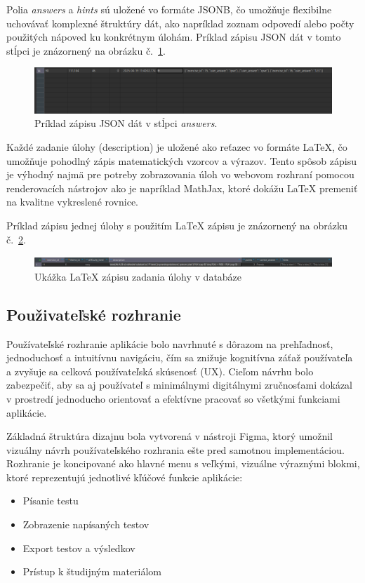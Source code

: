 Polia \textit{answers} a \textit{hints} sú uložené vo formáte JSONB, čo umožňuje flexibilne uchovávať komplexné štruktúry dát, ako napríklad zoznam odpovedí alebo počty použitých nápoved ku konkrétnym úlohám.
 Príklad zápisu JSON dát v tomto stĺpci je znázornený na obrázku č.~\ref{dbjsonb}.

 \begin{figure}[h!]
  \centering
  \includegraphics[width=\textwidth]{img/dbjsonb.png}
  \caption{Príklad zápisu JSON dát v stĺpci \textit{answers}.}
  \label{dbjsonb}
 \end{figure}

 Každé zadanie úlohy (description) je uložené ako reťazec vo formáte LaTeX, čo umožňuje pohodlný zápis matematických vzorcov a výrazov. Tento spôsob zápisu je výhodný najmä pre potreby zobrazovania úloh vo webovom rozhraní pomocou renderovacích nástrojov ako je napríklad MathJax, ktoré dokážu LaTeX premeniť na kvalitne vykreslené rovnice.

Príklad zápisu jednej úlohy s použitím LaTeX zápisu je znázornený na obrázku č.~\ref{latexpriklad}.

\begin{figure}[H]
  \centering
  \includegraphics[width=\textwidth]{img/latex_example.png}
  \caption{Ukážka LaTeX zápisu zadania úlohy v databáze}
  \label{latexpriklad}
\end{figure}


\subsection{Použivateľské rozhranie}

Používateľské rozhranie aplikácie bolo navrhnuté s dôrazom na prehľadnosť, jednoduchosť a intuitívnu navigáciu, čím sa znižuje kognitívna záťaž používateľa a zvyšuje sa celková používateľská skúsenosť (UX). Cieľom návrhu bolo zabezpečiť, aby sa aj používateľ s minimálnymi digitálnymi zručnosťami dokázal v prostredí jednoducho orientovať a efektívne pracovať so všetkými funkciami aplikácie.

Základná štruktúra dizajnu bola vytvorená v nástroji Figma, ktorý umožnil vizuálny návrh používateľského rozhrania ešte pred samotnou implementáciou. Rozhranie je koncipované ako hlavné menu s veľkými, vizuálne výraznými blokmi, ktoré reprezentujú jednotlivé kľúčové funkcie aplikácie:
\begin{itemize} 
  \item Písanie testu 
  \item Zobrazenie napísaných testov 
  \item Export testov a výsledkov 
  \item Prístup k študijným materiálom 
\end{itemize}

